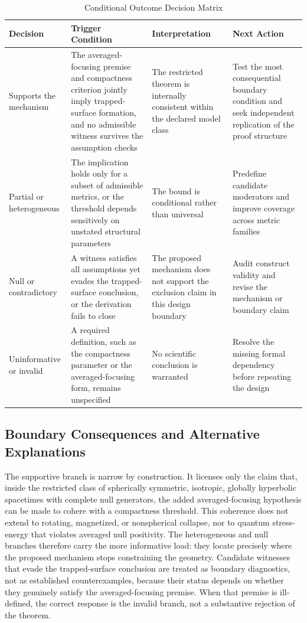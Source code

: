 \documentclass[conference]{IEEEtran}
\begin{document}
\begin{table}[htbp]
\centering
\footnotesize
\setlength{\tabcolsep}{3pt}
\renewcommand{\arraystretch}{1.12}
\caption{Conditional Outcome Decision Matrix}
\label{tab:expected-outcomes-expected-outcomes-matrix}
\begin{tabular}{|p{}|p{}|p{}|p{}|}
\hline
Decision & Trigger Condition & Interpretation & Next Action \\\hline
Supports the mechanism & The averaged-focusing premise and compactness criterion jointly imply trapped-surface formation, and no admissible witness survives the assumption checks & The restricted theorem is internally consistent within the declared model class & Test the most consequential boundary condition and seek independent replication of the proof structure \\\hline
Partial or heterogeneous & The implication holds only for a subset of admissible metrics, or the threshold depends sensitively on unstated structural parameters & The bound is conditional rather than universal & Predefine candidate moderators and improve coverage across metric families \\\hline
Null or contradictory & A witness satisfies all assumptions yet evades the trapped-surface conclusion, or the derivation fails to close & The proposed mechanism does not support the exclusion claim in this design boundary & Audit construct validity and revise the mechanism or boundary claim \\\hline
Uninformative or invalid & A required definition, such as the compactness parameter or the averaged-focusing form, remains unspecified & No scientific conclusion is warranted & Resolve the missing formal dependency before repeating the design \\\hline
\end{tabular}
\end{table}

\subsection{Boundary Consequences and Alternative Explanations}
The supportive branch is narrow by construction. It licenses only the claim that, inside the restricted class of spherically symmetric, isotropic, globally hyperbolic spacetimes with complete null generators, the added averaged-focusing hypothesis can be made to cohere with a compactness threshold. This coherence does not extend to rotating, magnetized, or nonspherical collapse, nor to quantum stress-energy that violates averaged null positivity. The heterogeneous and null branches therefore carry the more informative load: they locate precisely where the proposed mechanism stops constraining the geometry. Candidate witnesses that evade the trapped-surface conclusion are treated as boundary diagnostics, not as established counterexamples, because their status depends on whether they genuinely satisfy the averaged-focusing premise. When that premise is ill-defined, the correct response is the invalid branch, not a substantive rejection of the theorem.
\end{document}
